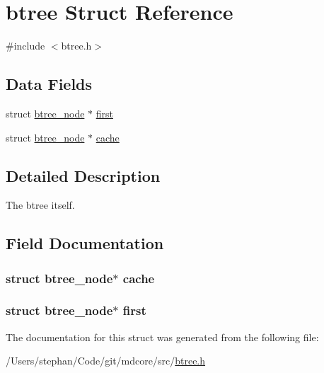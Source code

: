 \hypertarget{structbtree}{\section{btree Struct Reference}
\label{structbtree}
}


{\ttfamily \#include $<$btree.\-h$>$}

\subsection*{Data Fields}
\begin{DoxyCompactItemize}
\item 
struct \hyperlink{structbtree__node}{btree\-\_\-node} $\ast$ \hyperlink{structbtree_a4a61a21310d24f66cb6718dc213819a3}{first}
\item 
struct \hyperlink{structbtree__node}{btree\-\_\-node} $\ast$ \hyperlink{structbtree_a240ef27e120ab4682d1d39b938869964}{cache}
\end{DoxyCompactItemize}


\subsection{Detailed Description}
The btree itself. 

\subsection{Field Documentation}
\hypertarget{structbtree_a240ef27e120ab4682d1d39b938869964}{
\subsubsection[{cache}]{\setlength{\rightskip}{0pt plus 5cm}struct {\bf btree\-\_\-node}$\ast$ cache}}\label{structbtree_a240ef27e120ab4682d1d39b938869964}
\hypertarget{structbtree_a4a61a21310d24f66cb6718dc213819a3}{
\subsubsection[{first}]{\setlength{\rightskip}{0pt plus 5cm}struct {\bf btree\-\_\-node}$\ast$ first}}\label{structbtree_a4a61a21310d24f66cb6718dc213819a3}


The documentation for this struct was generated from the following file\-:\begin{DoxyCompactItemize}
\item 
/\-Users/stephan/\-Code/git/mdcore/src/\hyperlink{btree_8h}{btree.\-h}\end{DoxyCompactItemize}
